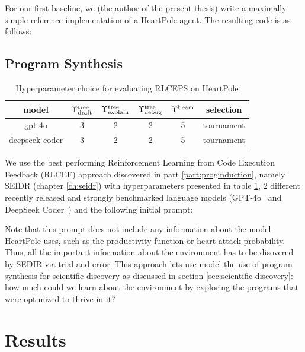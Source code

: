 For our first baseline, we (the author of the present thesis) write a maximally simple reference implementation of a HeartPole agent.
The resulting code is as follows:



\newpage
\subsection{Program Synthesis}

\begin{table}
    \centering
    \begin{tabular}{|c|c|c|c|c|c|}
        model & $\Upsilon^\text{tree}_\text{draft}$ & $\Upsilon^\text{tree}_\text{explain}$ & $\Upsilon^\text{tree}_\text{debug}$ & $\Upsilon^\text{beam}$ & selection \\
        \midrule
        gpt-4o & 3 & 2 & 2 & 5 & tournament \\
        deepseek-coder & 3 & 2 & 2 & 5 & tournament
    \end{tabular}
    \caption{Hyperparameter choice for evaluating RLCEPS on HeartPole}
    \label{tab:rlceps-heartpole}
\end{table}

We use the best performing Reinforcement Learning from Code Execution Feedback (RLCEF) approach discovered in part \ref{part:proginduction}, namely SEIDR (chapter \ref{ch:seidr}) with hyperparameters presented in table \ref{tab:rlceps-heartpole}, 2 different recently released and strongly benchmarked language models (GPT-4o~\cite{openaiGPT4oSystemCard2024} and DeepSeek Coder~\cite{guoDeepSeekCoderWhenLarge2024}) and the following initial prompt: 



Note that this prompt does not include any information about the model HeartPole uses, such as the productivity function or heart attack probability.
Thus, all the important information about the environment has to be disovered by SEDIR via trial and error.
This approach lets use model the use of program synthesis for scientific discovery as discussed in section \ref{sec:scientific-discovery}: how much could we learn about the environment by exploring the programs that were optimized to thrive in it?

\newpage
\section{Results}


